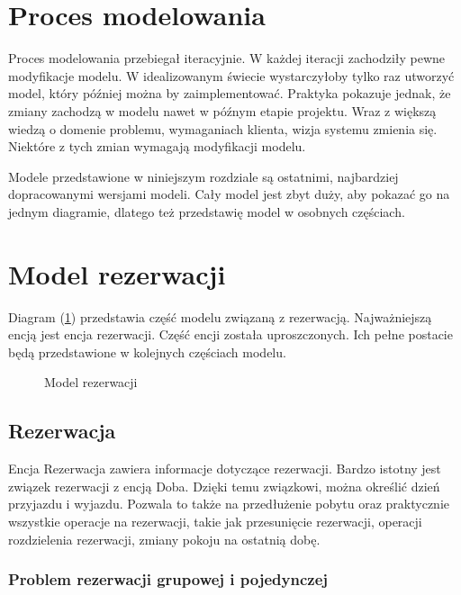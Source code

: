 \documentclass[a4paper,onecolumn,oneside,11pt,wide,floatssmall]{mwrep}
\theoremstyle{definition}
\theoremstyle{plain}%
\theoremstyle{remark}
\begin{document}
\section{Proces modelowania}
Proces modelowania przebiegał iteracyjnie. W każdej iteracji zachodziły pewne modyfikacje modelu. W idealizowanym świecie wystarczyłoby tylko raz utworzyć model, który później można by zaimplementować. Praktyka pokazuje jednak, że zmiany zachodzą w modelu nawet w późnym etapie projektu. Wraz z większą wiedzą o domenie problemu, wymaganiach klienta, wizja systemu zmienia się. Niektóre z tych zmian wymagają modyfikacji modelu. 

Modele przedstawione w niniejszym rozdziale są ostatnimi, najbardziej dopracowanymi wersjami modeli. Cały model jest zbyt duży, aby pokazać go na jednym diagramie, dlatego też przedstawię model w osobnych częściach.

\section{Model rezerwacji}
Diagram (\ref{fig:db-logical-model-reservation}) przedstawia część modelu związaną z rezerwacją. Najważniejszą encją jest encja rezerwacji. Część encji została uproszczonych. Ich pełne postacie będą przedstawione w kolejnych częściach modelu.

\begin{figure}[H]
  \begin{center}
  \end{center}
  \caption{Model rezerwacji}
  \label{fig:db-logical-model-reservation}
\end{figure}

\subsection{Rezerwacja}
Encja Rezerwacja zawiera informacje dotyczące rezerwacji. Bardzo istotny jest związek rezerwacji z encją Doba. Dzięki temu związkowi, można określić dzień przyjazdu i wyjazdu. Pozwala to także na przedłużenie pobytu oraz praktycznie wszystkie operacje na rezerwacji, takie jak przesunięcie rezerwacji, operacji rozdzielenia rezerwacji, zmiany pokoju na ostatnią dobę. 

\subsubsection{Problem rezerwacji grupowej i pojedynczej}
\end{document}
